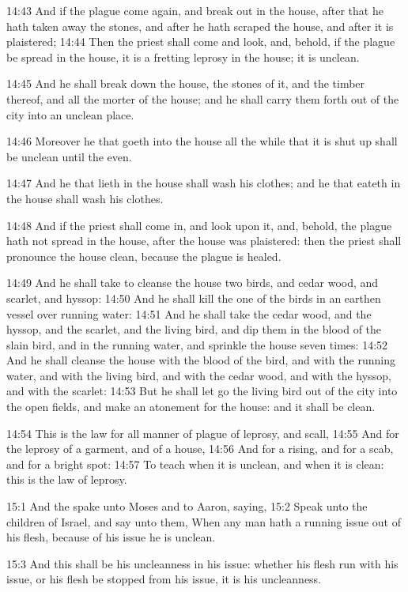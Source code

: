 14:43 And if the plague come again, and break out in the house, after that he hath taken away the stones, and after he hath scraped the house, and after it is plaistered; 14:44 Then the priest shall come and look, and, behold, if the plague be spread in the house, it is a fretting leprosy in the house; it is unclean.

14:45 And he shall break down the house, the stones of it, and the timber thereof, and all the morter of the house; and he shall carry them forth out of the city into an unclean place.

14:46 Moreover he that goeth into the house all the while that it is shut up shall be unclean until the even.

14:47 And he that lieth in the house shall wash his clothes; and he that eateth in the house shall wash his clothes.

14:48 And if the priest shall come in, and look upon it, and, behold, the plague hath not spread in the house, after the house was plaistered: then the priest shall pronounce the house clean, because the plague is healed.

14:49 And he shall take to cleanse the house two birds, and cedar wood, and scarlet, and hyssop: 14:50 And he shall kill the one of the birds in an earthen vessel over running water: 14:51 And he shall take the cedar wood, and the hyssop, and the scarlet, and the living bird, and dip them in the blood of the slain bird, and in the running water, and sprinkle the house seven times: 14:52 And he shall cleanse the house with the blood of the bird, and with the running water, and with the living bird, and with the cedar wood, and with the hyssop, and with the scarlet: 14:53 But he shall let go the living bird out of the city into the open fields, and make an atonement for the house: and it shall be clean.

14:54 This is the law for all manner of plague of leprosy, and scall, 14:55 And for the leprosy of a garment, and of a house, 14:56 And for a rising, and for a scab, and for a bright spot: 14:57 To teach when it is unclean, and when it is clean: this is the law of leprosy.

15:1 And the \LORD spake unto Moses and to Aaron, saying, 15:2 Speak unto the children of Israel, and say unto them, When any man hath a running issue out of his flesh, because of his issue he is unclean.

15:3 And this shall be his uncleanness in his issue: whether his flesh run with his issue, or his flesh be stopped from his issue, it is his uncleanness.

